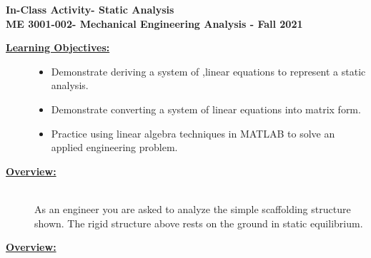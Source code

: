 \documentclass[12pt]{article}
\newcommand{\COURNAME}{ME 3001-002}
\newcommand{\CURRTERM}{Fall 2021} %
\newcommand{\ANUM}{6} %
\newcommand{\activitytitle}{Static Analysis} %
\begin{document}
\thispagestyle{plain}

\begin{center}
   {\bf \Large In-Class Activity\hspc\ANUM\hspc - \activitytitle}\vspace{3mm}\\
   {\bf \large \COURNAME - Mechanical Engineering Analysis - \CURRTERM} \vspace{5mm}\\
\end{center}

\begin{description}


\item[\textbf{\underline{Learning Objectives:}}] \hfill \vspace{0mm}

\begin{itemize}
	\item Demonstrate deriving a system of ,linear equations to represent a static analysis.
	\item Demonstrate converting a system of linear equations into matrix form.
	\item Practice using linear algebra techniques in MATLAB to solve an applied engineering problem.
\end{itemize}


\item[\textbf{\underline{Overview:}}] \hfill \vspace{3mm}\\

As an engineer you are asked to analyze the simple scaffolding structure shown. The rigid structure above rests on the ground in static equilibrium. 

\item[\textbf{\underline{Overview:}}] \hfill \vspace{3mm}\\
	
	
	

\end{description}
\end{document}
